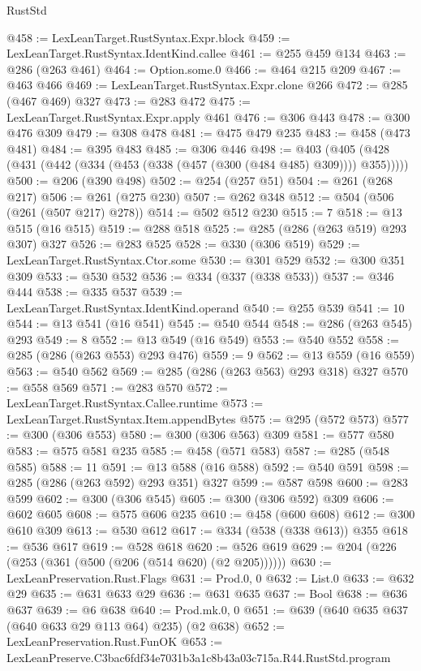 \begin{lexlean}{RustStd}
\begin{coremodule}
@458 := LexLeanTarget.RustSyntax.Expr.block
@459 := LexLeanTarget.RustSyntax.IdentKind.callee
@461 := @255 @459 @134
@463 := @286 (@263 @461)
@464 := Option.some.{0}
@466 := @464 @215 @209
@467 := @463 @466
@469 := LexLeanTarget.RustSyntax.Expr.clone @266
@472 := @285 (@467 @469) @327
@473 := @283 @472
@475 := LexLeanTarget.RustSyntax.Expr.apply @461
@476 := @306 @443
@478 := @300 @476 @309
@479 := @308 @478
@481 := @475 @479 @235
@483 := @458 (@473 @481)
@484 := @395 @483
@485 := @306 @446
@498 := @403 (@405 (@428 (@431 (@442 (@334 (@453 (@338 (@457 (@300 (@484 @485) @309)))) @355)))))
@500 := @206 (@390 @498)
@502 := @254 (@257 @51)
@504 := @261 (@268 @217)
@506 := @261 (@275 @230)
@507 := @262 @348
@512 := @504 (@506 (@261 (@507 @217) @278))
@514 := @502 @512 @230
@515 := 7
@518 := @13 @515 (@16 @515)
@519 := @288 @518
@525 := @285 (@286 (@263 @519) @293 @307) @327
@526 := @283 @525
@528 := @330 (@306 @519)
@529 := LexLeanTarget.RustSyntax.Ctor.some
@530 := @301 @529
@532 := @300 @351 @309
@533 := @530 @532
@536 := @334 (@337 (@338 @533))
@537 := @346 @444
@538 := @335 @537
@539 := LexLeanTarget.RustSyntax.IdentKind.operand
@540 := @255 @539
@541 := 10
@544 := @13 @541 (@16 @541)
@545 := @540 @544
@548 := @286 (@263 @545) @293
@549 := 8
@552 := @13 @549 (@16 @549)
@553 := @540 @552
@558 := @285 (@286 (@263 @553) @293 @476)
@559 := 9
@562 := @13 @559 (@16 @559)
@563 := @540 @562
@569 := @285 (@286 (@263 @563) @293 @318) @327
@570 := @558 @569
@571 := @283 @570
@572 := LexLeanTarget.RustSyntax.Callee.runtime
@573 := LexLeanTarget.RustSyntax.Item.appendBytes
@575 := @295 (@572 @573)
@577 := @300 (@306 @553)
@580 := @300 (@306 @563) @309
@581 := @577 @580
@583 := @575 @581 @235
@585 := @458 (@571 @583)
@587 := @285 (@548 @585)
@588 := 11
@591 := @13 @588 (@16 @588)
@592 := @540 @591
@598 := @285 (@286 (@263 @592) @293 @351) @327
@599 := @587 @598
@600 := @283 @599
@602 := @300 (@306 @545)
@605 := @300 (@306 @592) @309
@606 := @602 @605
@608 := @575 @606 @235
@610 := @458 (@600 @608)
@612 := @300 @610 @309
@613 := @530 @612
@617 := @334 (@538 (@338 @613)) @355
@618 := @536 @617
@619 := @528 @618
@620 := @526 @619
@629 := @204 (@226 (@253 (@361 (@500 (@206 (@514 @620) (@2 @205))))))
@630 := LexLeanPreservation.Rust.Flags
@631 := Prod.{0, 0}
@632 := List.{0}
@633 := @632 @29
@635 := @631 @633 @29
@636 := @631 @635
@637 := Bool
@638 := @636 @637
@639 := @6 @638
@640 := Prod.mk.{0, 0}
@651 := @639 (@640 @635 @637 (@640 @633 @29 @113 @64) @235) (@2 @638)
@652 := LexLeanPreservation.Rust.FunOK
@653 := LexLeanPreserve.C3bac6fdf34e7031b3a1c8b43a03c715a.R44.RustStd.program

\end{coremodule}
\end{lexlean}
